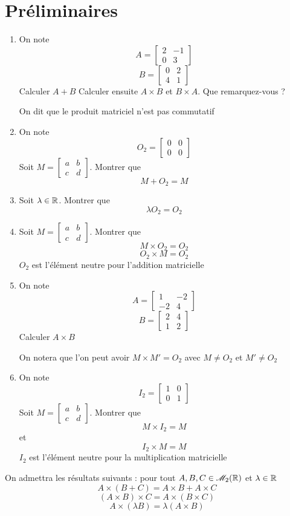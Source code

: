 \section{Préliminaires}
\begin{enumerate}
\item 
On note 
$$A = \begin{bmatrix} 2 & -1 \\ 0 & 3 \end{bmatrix}$$
$$B = \begin{bmatrix} 0 & 2  \\ 4 & 1 \end{bmatrix}$$
Calculer $A+B$\newline
Calculer ensuite $A\times B$ et $B\times A$. Que remarquez-vous ?\newline

On dit que le produit matriciel n'est pas commutatif
\item On note 
$$O_2 = \begin{bmatrix} 0 & 0 \\ 0 & 0 \end{bmatrix}$$
Soit $M = \begin{bmatrix} a & b \\ c& d \end{bmatrix}$. Montrer que 
$$M + O_2 = M$$
\item Soit $\lambda \in \mathbb{R}$. Montrer que 
$$\lambda O_2 = O_2$$
\item Soit $M = \begin{bmatrix} a & b \\ c & d\end{bmatrix}$. Montrer que 
$$M\times O_2 = O_2$$
$$O_2 \times M = O_2$$
$O_2$ est l'élément neutre pour l'addition matricielle
\item On note 
$$A = \begin{bmatrix} 1 & -2\\ -2 & 4\end{bmatrix}$$
$$B = \begin{bmatrix} 2 & 4\\ 1 & 2\end{bmatrix}$$
Calculer $A \times B$\newline

On notera que l'on peut avoir $M\times M' = O_2$ avec $M \neq O_2$ et $M' \neq O_2$
\item On note 
$$I_2 = \begin{bmatrix} 1 & 0 \\ 0 & 1 \end{bmatrix}$$
Soit $M = \begin{bmatrix} a & b \\ c & d \end{bmatrix}$. Montrer que 
$$M\times I_2 = M$$
et 
$$I_2 \times M = M$$
$I_2$ est l'élément neutre pour la multiplication matricielle
\end{enumerate}
On admettra les résultats suivants : pour tout $A,B,C \in \mathscr{M}_2(\mathbb{R})$ et $\lambda \in \mathbb{R}$
$$\boxed{A\times(B+C) = A \times B + A \times C}$$
$$\boxed{(A\times B)\times C = A\times(B\times C)}$$
$$\boxed{A \times (\lambda B) = \lambda(A\times B)}$$
